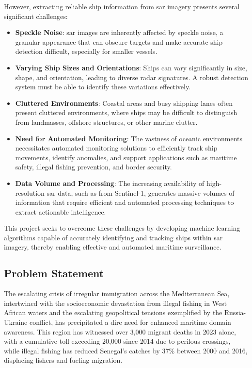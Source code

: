\documentclass{article}
\begin{document}
However, extracting reliable ship information from \acrshort{sar} imagery presents several significant challenges:
\begin{itemize}
    \item \textbf{Speckle Noise}: \acrshort{sar} images are inherently affected by speckle noise, a granular appearance that can obscure targets and make accurate ship detection difficult, especially for smaller vessels. \item \textbf{Varying Ship Sizes and Orientations}: Ships can vary significantly in size, shape, and orientation, leading to diverse radar signatures. A robust detection system must be able to identify these variations effectively. \item \textbf{Cluttered Environments}: Coastal areas and busy shipping lanes often present cluttered environments, where ships may be difficult to distinguish from landmasses, offshore structures, or other marine clutter. \item \textbf{Need for Automated Monitoring}: The vastness of oceanic environments necessitates automated monitoring solutions to efficiently track ship movements, identify anomalies, and support applications such as maritime safety, illegal fishing prevention, and border security. \item \textbf{Data Volume and Processing}: The increasing availability of high-resolution \acrshort{sar} data, such as from Sentinel-1, generates massive volumes of information that require efficient and automated processing techniques to extract actionable intelligence. \end{itemize}

This project seeks to overcome these challenges by developing machine learning algorithms capable of accurately identifying and tracking ships within \acrshort{sar} imagery, thereby enabling effective and automated maritime surveillance. \subsection{Problem Statement}
The escalating crisis of irregular immigration across the Mediterranean Sea, intertwined with the socioeconomic devastation from illegal fishing in West African waters and the escalating geopolitical tensions exemplified by the Russia-Ukraine conflict, has precipitated a dire need for enhanced maritime domain awareness. This region has witnessed over 3,000 migrant deaths in 2023 alone, with a cumulative toll exceeding 20,000 since 2014 due to perilous crossings, while illegal fishing has reduced Senegal’s catches by 37\% between 2000 and 2016, displacing fishers and fueling migration. \\
\end{document}
